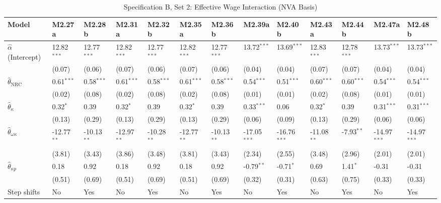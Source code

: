 \FloatBarrier
\begin{table}[h!]
\centering
\caption{Specification B, Set 2: Effective Wage Interaction (NVA Basis)}
\label{tab:specB_set2_nva_app}
\tiny
\setlength{\tabcolsep}{1.5pt}
\begin{tabular}{p{3.2cm}p{1.0cm}p{1.0cm}p{1.0cm}p{1.0cm}p{1.0cm}p{1.0cm}p{1.0cm}p{1.0cm}p{1.0cm}p{1.0cm}p{1.0cm}p{1.0cm}}
\toprule
Model & M2.27a & M2.28b & M2.31a & M2.32b & M2.35a & M2.36b & M2.39a & M2.40b & M2.43a & M2.44b & M2.47a & M2.48b \\
\midrule
$\hat{\alpha}$ (Intercept) & 12.82$^{***}$ & 12.77$^{***}$ & 12.82$^{***}$ & 12.77$^{***}$ & 12.82$^{***}$ & 12.77$^{***}$ & 13.72$^{***}$ & 13.69$^{***}$ & 12.83$^{***}$ & 12.78$^{***}$ & 13.73$^{***}$ & 13.73$^{***}$ \\
 & (0.07) & (0.06) & (0.07) & (0.06) & (0.07) & (0.06) & (0.04) & (0.04) & (0.07) & (0.07) & (0.04) & (0.04) \\
$\hat{\theta}_{\text{NRC}}$ & 0.61$^{***}$ & 0.58$^{***}$ & 0.61$^{***}$ & 0.58$^{***}$ & 0.61$^{***}$ & 0.58$^{***}$ & 0.54$^{***}$ & 0.51$^{***}$ & 0.60$^{***}$ & 0.60$^{***}$ & 0.54$^{***}$ & 0.54$^{***}$ \\
 & (0.02) & (0.08) & (0.02) & (0.08) & (0.02) & (0.08) & (0.01) & (0.01) & (0.02) & (0.08) & (0.01) & (0.01) \\
$\hat{\theta}_{\kappa}$ & 0.32$^{*}$ & 0.39 & 0.32$^{*}$ & 0.39 & 0.32$^{*}$ & 0.39 & 0.33$^{***}$ & 0.06 & 0.32$^{*}$ & 0.39 & 0.31$^{***}$ & 0.31$^{***}$ \\
 & (0.13) & (0.29) & (0.13) & (0.29) & (0.13) & (0.29) & (0.06) & (0.09) & (0.13) & (0.29) & (0.06) & (0.06) \\
$\hat{\theta}_{\omega\kappa}$ & -12.77$^{**}$ & -10.13$^{**}$ & -12.97$^{**}$ & -10.28$^{**}$ & -12.77$^{**}$ & -10.13$^{**}$ & -17.05$^{***}$ & -16.76$^{***}$ & -11.08$^{**}$ & -7.93$^{**}$ & -14.97$^{***}$ & -14.97$^{***}$ \\
 & (3.81) & (3.43) & (3.86) & (3.48) & (3.81) & (3.43) & (2.34) & (2.55) & (3.48) & (2.96) & (2.01) & (2.01) \\
$\hat{\theta}_{\kappa p}$ & 0.18 & 0.92 & 0.18 & 0.92 & 0.18 & 0.92 & -0.79$^{**}$ & -0.71$^{*}$ & 0.69 & 1.41$^{*}$ & -0.31 & -0.31 \\
 & (0.51) & (0.69) & (0.51) & (0.69) & (0.51) & (0.69) & (0.32) & (0.31) & (0.63) & (0.75) & (0.33) & (0.33) \\
\midrule
Step shifts & No & Yes & No & Yes & No & Yes & No & Yes & No & Yes & No & Yes \\

\end{tabular}
\end{table}
